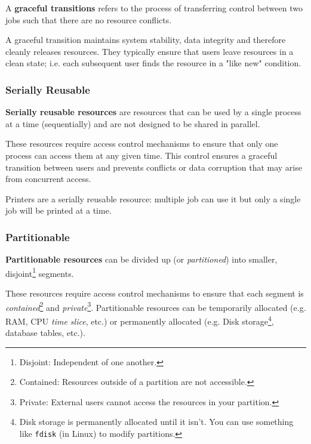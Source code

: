 \documentclass{article}
\begin{document}
\begin{tcolorbox}[title=Definition: Graceful Transition]
  A \textbf{graceful transitions} refers to the process of transferring control between two jobs
  such that there are no resource conflicts. 
\end{tcolorbox}

A graceful transition maintains system stability, data integrity and therefore cleanly releases
resources. They typically ensure that users leave resources in a clean state; i.e. each
subsequent user finds the resource in a "like new" condition.


\subsubsection{Serially Reusable}
\begin{tcolorbox}[title=Definition: Serially Reusable Resource]
  \textbf{Serially reusable resources} are resources that can be used by a single process at a time
  (sequentially) and are not designed to be shared in parallel.
\end{tcolorbox}

These resources require access control mechanisms to ensure that only one process can access them at
any given time. This control ensures a graceful transition between users and prevents conflicts or
data corruption that may arise from concurrent access.

\begin{tcolorbox}[colback=blue!5!white,colframe=black!75!blue,title=Example: Printing Process]
  Printers are a serially reusable resource: multiple job can use it but only a single job will be
  printed at a time. 
\end{tcolorbox}

\subsubsection{Partitionable}
\begin{tcolorbox}[title=Definition: Partitionable Resource]
  \textbf{Partitionable resources} can be divided up (or \textit{partitioned}) into smaller,
  disjoint\footnote{Disjoint: Independent of one another.} segments.  
\end{tcolorbox}

These resources require access control mechanisms to ensure that each segment is
\textit{contained}\footnote{Contained: Resources outside of a partition are not accessible.} and
\textit{private}\footnote{Private: External users cannot access the resources in your
  partition.}. Partitionable resources can be temporarily allocated (e.g. RAM, CPU \textit{time
  slice}, etc.) or permanently allocated (e.g. Disk
storage\footnote{Disk storage is permanently allocated until it isn't. You can use something like
  \texttt{fdisk} (in Linux) to modify partitions.}, database tables, etc.).
\end{document}
